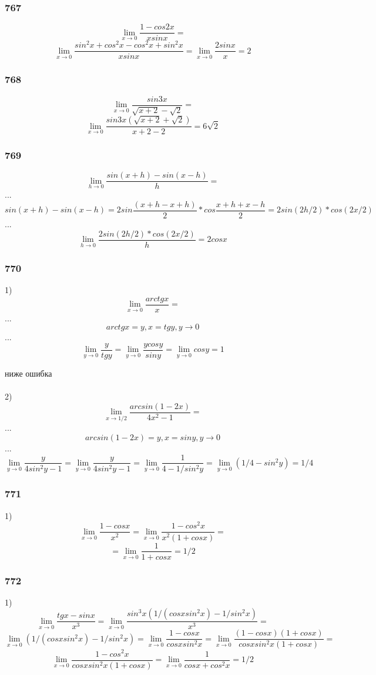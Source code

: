 \documentclass[12pt]{article}
\begin{document}
\newpage
\subsubsection{767}
$$
\lim_{x\to 0} \frac{1-cos2x}{xsinx} = 
$$
$$
\lim_{x\to 0} \frac{sin^2x+cos^2x-cos^2x+sin^2x}{xsinx} =  \lim_{x\to 0} \frac{2sinx}{x} = 2
$$

\newpage
\subsubsection{768}
$$
\lim_{x\to 0} \frac{sin3x}{\sqrt{x+2}-\sqrt{2}} = 
$$
$$
\lim_{x\to 0} \frac{sin3x(\sqrt{x+2}+\sqrt{2})}{x+2-2} = 6\sqrt{2}
$$

\newpage
\subsubsection{769}
$$
\lim_{h\to 0} \frac{sin(x+h)-sin(x-h)}{h} = 
$$
...
$$
sin(x+h)-sin(x-h) = 2sin\frac{(x+h-x+h)}{2}*cos\frac{x+h+x-h}{2} = 2sin(2h/2)*cos(2x/2)
$$
...
$$
\lim_{h\to 0} \frac{2sin(2h/2)*cos(2x/2)}{h} = 2cosx
$$

\newpage
\subsubsection{770}
1)
$$
\lim_{x\to 0} \frac{arctgx}{x} = 
$$
...
$$
arctgx = y, x = tgy, y \to  0 
$$
...
$$
\lim_{y\to 0} \frac{y}{tgy} = \lim_{y\to 0} \frac{ycosy}{siny} =\lim_{y\to 0}  cosy = 1 
$$

ниже ошибка\\
 \\
2)
$$
\lim_{x\to 1/2} \frac{arcsin(1-2x)}{4x^2-1} = 
$$
...
$$
arcsin(1-2x) = y, x = siny, y \to  0 
$$
...
$$
\lim_{y\to 0} \frac{y}{4sin^2y-1} = \lim_{y\to 0} \frac{y}{4sin^2y-1} =\lim_{y\to 0} \frac{1}{4-1/sin^2y}=\lim_{y\to 0} (1/4 - sin^2y) = 1/4
$$

\newpage
\subsubsection{771}
1)
$$
\lim_{x\to 0} \frac{1-cosx}{x^2} = 
\lim_{x\to 0} \frac{1-cos^2x}{x^2(1+cosx)}=
$$
$$
=\lim_{x\to 0} \frac{1}{1+cosx}=1/2
$$

\newpage
\subsubsection{772}
1)
$$
\lim_{x\to 0} \frac{tgx-sinx}{x^3} = 
\lim_{x\to 0} \frac{sin^3x(1/(cosxsin^2x)-1/sin^2x)}{x^3} =
$$
$$
\lim_{x\to 0} (1/(cosxsin^2x)-1/sin^2x) =
\lim_{x\to 0} \frac{1-cosx}{cosxsin^2x} =
\lim_{x\to 0} \frac{(1-cosx)(1+cosx)}{cosxsin^2x(1+cosx)} =
$$
$$
\lim_{x\to 0} \frac{1-cos^2x}{cosxsin^2x(1+cosx)} =
\lim_{x\to 0} \frac{1}{cosx+cos^2x} = 1/2
$$
\end{document}
